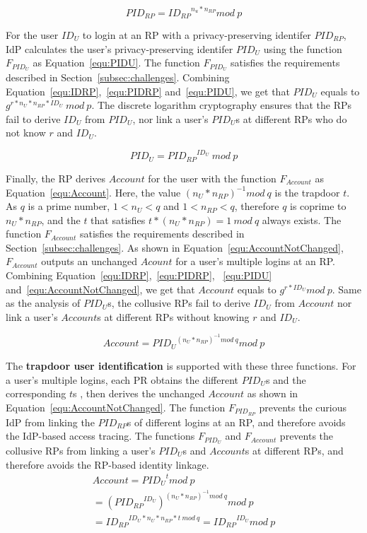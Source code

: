  \begin{equation}
    PID_{RP} = {ID_{RP}}^{n_{u}* n_{RP}} mod \ p
   \label{equ:PIDRP}
   \end{equation}

For the user $ID_U$ to login at an RP with a privacy-preserving identifer $PID_{RP}$, IdP calculates the user's privacy-preserving identifer $PID_U$ using the function  $F_{PID_{U}}$ as Equation~\ref{equ:PIDU}. The function $F_{PID_{U}}$ satisfies the requirements described in Section~\ref{subsec:challenges}.
Combining Equation~\ref{equ:IDRP},~\ref{equ:PIDRP} and~\ref{equ:PIDU}, we get that  $PID_U$ equals to $g^{r*n_U*n_{RP}*ID_U}\ mod \ p$.
The discrete logarithm cryptography ensures that the RPs fail to derive $ID_U$ from $PID_U$,
nor link a user's $PID_U$s at different RPs who do not know $r$ and $ID_U$.


\begin{equation}
 PID_U = {PID_{RP}}^{ID_U} \ mod \ p
 \label{equ:PIDU}
\end{equation}

Finally, the RP derives $Account$ for the user with the function $F_{Account}$ as Equation~\ref{equ:Account}. Here, the value $(n_U*n_{RP})^{-1} mod \ q$ is the trapdoor $t$. As $q$ is a prime number, $1< n_U < q$ and $1< n_{RP} < q$, therefore $q$ is coprime to $n_U*n_{RP}$, and the $t$ that satisfies $t*(n_U*n_{RP}) = 1\ mod \ q$ always exists. The function $F_{Account}$ satisfies the requirements described in Section~\ref{subsec:challenges}.  As shown in Equation~\ref{equ:AccountNotChanged},  $F_{Account}$ outputs an unchanged $Acount$ for a user's multiple logins at an RP.
Combining Equation~\ref{equ:IDRP},~\ref{equ:PIDRP}, ~\ref{equ:PIDU} and~\ref{equ:AccountNotChanged}, we get that $Account$ equals to $g^{r*ID_U} mod \ p$.
Same as the analysis of $PID_U$s, the collusive RPs fail to derive $ID_U$ from $Account$ nor link a user's $Account$s at different RPs without knowing $r$ and $ID_U$.

 \begin{equation}
   Account = {PID_U}^{(n_U*n_{RP})^{-1} mod \ q} mod \ p
   \label{equ:Account}
   \end{equation}

The \textbf{trapdoor user identification} is supported with these three functions.
For a user's multiple logins, each PR obtains the different $PID_U$s and the corresponding $t$s , then derives the unchanged $Account$  as shown in Equation~\ref{equ:AccountNotChanged}.
The function $F_{PID_{RP}}$ prevents the curious IdP from linking the $PID_{RP}$s of different logins at an RP, and therefore avoids  the  IdP-based access tracing.
The functions $F_{PID_{U}}$ and $F_{Account}$ prevents the collusive RPs from linking a user's $PID_U$s and $Account$s at different RPs, and therefore avoids the RP-based identity linkage.
 \begin{multline}\label{equ:AccountNotChanged}
   Account =  {PID_{U}}^{t} mod \ p  \\
   = {({PID_{RP}}^{ID_U})}^{{(n_U*n_{RP})^{-1} mod \ q}} mod \ p \\
   = {ID_{RP}} ^ {ID_U * n_U * n_{RP} *t\ mod\ q} = {ID_{RP}}^{ID_U} mod \ p
 \end{multline}

